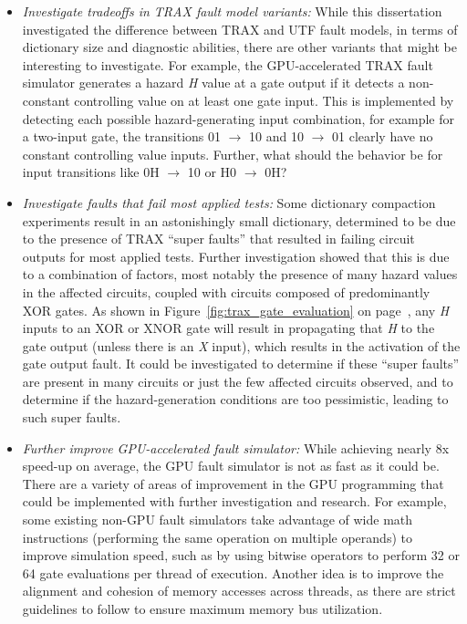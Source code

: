 \begin{itemize}
\item{\textit{Investigate tradeoffs in TRAX fault model variants:} While this dissertation investigated the difference between TRAX and UTF fault models, in terms of dictionary size and diagnostic abilities, there are other variants that might be interesting to investigate.
%
For example, the GPU-accelerated TRAX fault simulator generates a hazard \textit{H} value at a gate output if it detects a non-constant controlling value on at least one gate input.
%
This is implemented by detecting each possible hazard-generating input combination, for example for a two-input gate, the transitions 01 $\rightarrow$ 10 and 10 $\rightarrow$ 01 clearly have no constant controlling value inputs.
%
Further, what should the behavior be for input transitions like 0H $\rightarrow$ 10 or H0 $\rightarrow$ 0H?}
\item{\textit{Investigate faults that fail most applied tests:} Some dictionary compaction experiments result in an astonishingly small dictionary, determined to be due to the presence of TRAX ``super faults'' that resulted in failing circuit outputs for most applied tests.
%
Further investigation showed that this is due to a combination of factors, most notably the presence of many hazard values in the affected circuits, coupled with circuits composed of predominantly XOR gates.
%
As shown in Figure~\ref{fig:trax_gate_evaluation} on page~\pageref{fig:trax_gate_evaluation}, any \textit{H} inputs to an XOR or XNOR gate will result in propagating that \textit{H} to the gate output (unless there is an \textit{X} input), which results in the activation of the gate output fault.
%
It could be investigated to determine if these ``super faults'' are present in many circuits or just the few affected circuits observed, and to determine if the hazard-generation conditions are too pessimistic, leading to such super faults.}
\item{\textit{Further improve GPU-accelerated fault simulator:} While achieving nearly 8x speed-up on average, the GPU fault simulator is not as fast as it could be.
%
There are a variety of areas of improvement in the GPU programming that could be implemented with further investigation and research.
%
For example, some existing non-GPU fault simulators take advantage of wide math instructions (performing the same operation on multiple operands) to improve simulation speed, such as by using bitwise operators to perform 32 or 64 gate evaluations per thread of execution.
%
Another idea is to improve the alignment and cohesion of memory accesses across threads, as there are strict guidelines to follow to ensure maximum memory bus utilization.
}
\end{itemize}
